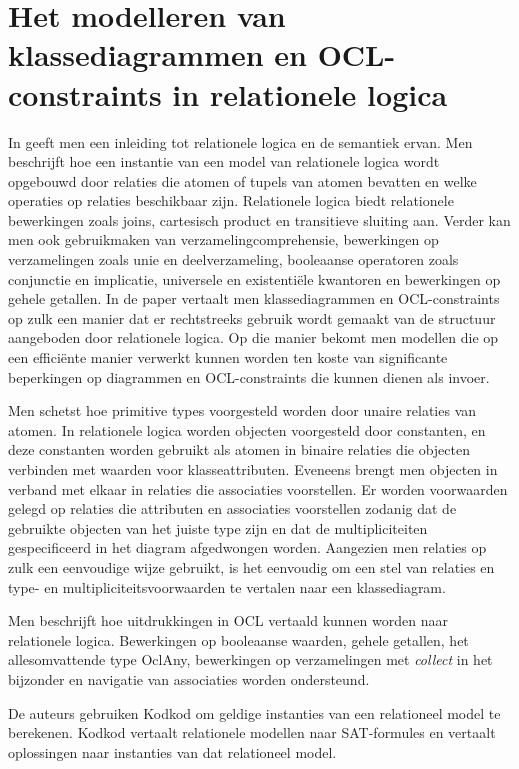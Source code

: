 \section{Het modelleren van klassediagrammen en OCL-constraints in relationele logica}
In \cite{KuhlmannMirco2012FUaO} geeft men een inleiding tot relationele logica en de semantiek ervan. Men beschrijft hoe een instantie van een model van relationele logica wordt opgebouwd door relaties die atomen of tupels van atomen bevatten en welke operaties op relaties beschikbaar zijn. Relationele logica biedt relationele bewerkingen zoals joins, cartesisch product en transitieve sluiting aan. Verder kan men ook gebruikmaken van verzamelingcomprehensie, bewerkingen op verzamelingen zoals unie en deelverzameling, booleaanse operatoren zoals conjunctie en implicatie, universele en existenti\"ele kwantoren en bewerkingen op gehele getallen. In de paper vertaalt men klassediagrammen en OCL-constraints\cite{WarmerJosB1999Ocl:}  op zulk een manier dat er rechtstreeks gebruik wordt gemaakt van de structuur aangeboden door relationele logica. Op die manier bekomt men modellen die op een effici\"ente manier verwerkt kunnen worden ten koste van significante beperkingen op diagrammen en OCL-constraints die kunnen dienen als invoer.

Men schetst hoe primitive types voorgesteld worden door unaire relaties van atomen. In relationele logica worden objecten voorgesteld door constanten, en deze constanten worden gebruikt als atomen in binaire relaties die objecten verbinden met waarden voor klasseattributen. Eveneens brengt men objecten in verband met elkaar in relaties die associaties voorstellen. Er worden voorwaarden gelegd op relaties die attributen en associaties voorstellen zodanig dat de gebruikte objecten van het juiste type zijn en dat de multipliciteiten gespecificeerd in het diagram afgedwongen worden. Aangezien men relaties op zulk een eenvoudige wijze gebruikt, is het eenvoudig om een stel van relaties en type- en multipliciteitsvoorwaarden te vertalen naar een klassediagram.

Men beschrijft hoe uitdrukkingen in OCL vertaald kunnen worden naar relationele logica. Bewerkingen op booleaanse waarden, gehele getallen, het allesomvattende type OclAny\cite{WarmerJosB1999Ocl:}, bewerkingen op verzamelingen met \textit{collect} in het bijzonder en navigatie van associaties worden ondersteund.

De auteurs gebruiken Kodkod\cite{10.1007/978-3-540-71209-1_49} om geldige instanties van een relationeel model te berekenen. Kodkod vertaalt relationele modellen naar SAT-formules en vertaalt oplossingen naar instanties van dat relationeel model.

